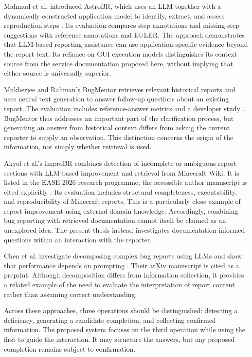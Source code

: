 Mahmud et al. introduced AstroBR, which uses an LLM together with a dynamically constructed application model to identify, extract, and assess reproduction steps \cite{mahmud2025}. Its evaluation compares step annotations and missing-step suggestions with reference annotations and EULER. The approach demonstrates that LLM-based reporting assistance can use application-specific evidence beyond the report text. Its reliance on GUI execution models distinguishes its context source from the service documentation proposed here, without implying that either source is universally superior.

Mukherjee and Rahman's BugMentor retrieves relevant historical reports and uses neural text generation to answer follow-up questions about an existing report. The evaluation includes reference-answer metrics and a developer study \cite{bugmentor2026}. BugMentor thus addresses an important part of the clarification process, but generating an answer from historical context differs from asking the current reporter to supply an observation. This distinction concerns the origin of the information, not simply whether retrieval is used.

Akyol et al.'s ImproBR combines detection of incomplete or ambiguous report sections with LLM-based improvement and retrieval from Minecraft Wiki. It is listed in the EASE 2026 research programme; the accessible author manuscript is cited explicitly \cite{akyol2026}. Its evaluation includes structural completeness, executability, and reproducibility of Minecraft reports. This is a particularly close example of report improvement using external domain knowledge. Accordingly, combining bug reporting with retrieved documentation cannot itself be claimed as an unexplored idea. The present thesis instead investigates documentation-informed questions within an interaction with the reporter.

Chen et al. investigate decomposing complex bug reports using LLMs and show that performance depends on prompting \cite{chen2025}. Their arXiv manuscript is cited as a preprint. Although decomposition differs from information collection, it provides a related example of the need to evaluate the interpretation of report content rather than assuming correct understanding.

Across these approaches, three operations should be distinguished: detecting a deficiency, generating a candidate completion, and collecting confirmed information. The proposed system focuses on the third operation while using the first to guide the interaction. It may structure the answers, but any proposed completion remains subject to confirmation.

